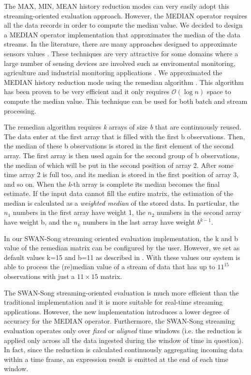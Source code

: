 The MAX, MIN, MEAN history reduction modes can very easily adopt this streaming-oriented evaluation approach. However, the MEDIAN operator requires all the data records in order to compute the median value. We decided to design a MEDIAN operator implementation that approximates the median of the data streams. In the literature, there are many approaches designed to approximate sensors values \cite{approximateprobabilistic, approximationdatabase}. These techniques are very attractive for some domains where a large number of sensing devices are involved such as enviromental monitoring, agriculture and industrial monitoring applications \cite{approximationtimeseries}. We approximated the MEDIAN history reduction mode using the remedian algorithm \cite{remedian}. This algorithm has been proven to be very efficient \cite{remedianfurtheranalysis} and it only requires $\mathcal{O}(\log{}n)$ space to compute the median value. This technique can be used for both batch and stream processing. 

The remedian algorithm requires \emph{k} arrays of size \emph{b} that are continuously reused. The data enter at the first array that is filled with the first b observations. Then, the median of these b observations is stored in the first element of the second array. The first array is then used again for the second group of b observations, the median of which will be put in the second position of array 2. After some time array 2 is full too, and its median is stored in the first position of array 3, and so on. When the \emph{k}-th array is complete its median becomes the final estimate. If the input data cannot fill the entire matrix, the estimation of the median is calculated as a \emph{weighted median} of the stored data. In particular, the $n_1$ numbers in the first array have weight 1, the $n_2$ numbers in the second array have weight b, and the \emph{$n_k$} numbers in the last array have weight $b^{k-1}$.

In our SWAN-Song streaming oriented evaluation implementation, the k and b value of the remedian matrix can be configured by the user. However, we set as default values k=15 and b=11 as described in \cite{remedian}. With these values our system is able to process the (re)median value of a stream of data that has up to $11^{15}$ observations with just a $11 \times 15$ matrix. 

The SWAN-Song streaming-oriented evaluation is much more efficient than the traditional implementation and it is more suitable for real-time streaming applications. However, the new implementation introduces a lower degree of accuracy for the MEDIAN operator. Furthermore, the SWAN-Song streaming evaluation operates only over \emph{fixed} or \emph{aligned} time windows (i.e. the reduction is applied only across all the data ingested during the window of time in question). In fact, since the reduction is calculated continuously aggregating incoming data within a time frame, an expression result is emitted at the end of each time window. 

